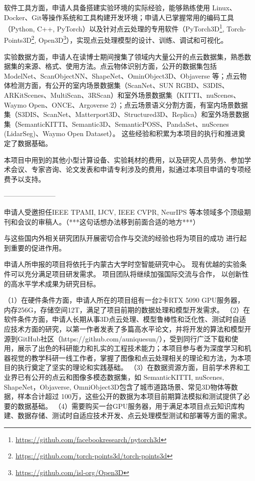 \documentclass[12pt]{article}
\begin{document}
软件工具方面，申请人具备搭建实验环境的实际经验，能够熟练使用 Linux、Docker、Git等操作系统和工具构建开发环境；申请人已掌握常用的编码工具（Python, C++, PyTorch）以及针对点云处理的专用软件（PyTorch3D\footnote{\url{https://github.com/facebookresearch/pytorch3d}}, Torch-Points3D\footnote{\url{https://github.com/torch-points3d/torch-points3d}}, Open3D\footnote{\url{https://github.com/isl-org/Open3D}}），实现点云处理模型的设计、训练、调试和可视化。

实验数据方面，申请人在读博士期间搜集了领域内大量公开的点云数据集，熟悉数据集的来源、格式、使用方法。点云物体识别方面，公开的数据集包括 ModelNet、ScanObjectNN、ShapeNet、OminObject3D、Objaverse 等；点云物体检测方面，有公开的室内场景数据集（ScanNet、SUN RGBD、S3DIS、ARKitScenes、MultiScan、3RScan）和室外场景数据集（KITTI、nuScenes、Waymo Open、ONCE、Argoverse 2）；点云场景语义分割方面，有室内场景数据集（S3DIS、ScanNet、Matterport3D、Structured3D、Replica）和室外场景数据集（SemanticKITTI、Semantic3D、SemanticPOSS、PandaSet、nuScenes (LidarSeg)、Waymo Open Dataset）。
这些经验和积累为本项目的执行和推进奠定了数据基础。

本项目中用到的其他小型计算设备、实验耗材的费用，以及研究人员劳务、参加学术会议、专家咨询、论文发表和申请专利涉及的费用，拟通过本项目申请的专项经费予以支持。

-----------------------

申请人受邀担任IEEE TPAMI, IJCV, IEEE CVPR, NeurIPS 等本领域多个顶级期刊和会议的审稿人。（***这句话想办法移到前面合适的地方***）

与这些国内外相关研究团队开展密切合作与交流的经验也将为项目的成功
进行起到重要的促进作用。

申请人所申报的项目将依托于内蒙古大学时空智能研究中心。
现有优越的实验条件可以充分满足项目研发需求。
项目团队将继续加强国际交流与合作，
以创新性的高水平学术成果为研究目标。

（1）在硬件条件方面，申请人所在的项目组有一台2卡RTX 5090 GPU服务器，内存256G，存储空间12T，满足了项目前期的数据处理和模型开发需求。
（2）在软件条件方面，申请人长期从事3D点云处理、模型鲁棒性和泛化性、测试时自适应技术方面的研究，以第一作者发表了多篇高水平论文，并将开发的算法和模型开源到GitHub社区（https://github.com/auniquesun/），受到同行广泛下载和使用，展示了出色的科研能力和扎实的工程技术能力；本项目参与者为深度学习和机器视觉的教学科研一线工作者，掌握了图像和点云处理相关的理论和方法，为本项目的执行奠定了坚实的理论和实践基础。
（3）在数据资源方面，目前学术界和工业界已有公开的点云和图像多模态数据集，如 SemanticKITTI, nuScenes, ShapeNet，Objaverse, OmniObject3D包含了城市道路场景、常见3D物体等数据，样本合计超过 100万，这些公开的数据为本项目前期算法模拟和测试提供了必要的数据基础。
（4）需要购买一台GPU服务器，用于满足本项目点云知识库构建、数据存储、测试时自适应技术开发、点云处理模型测试和部署等方面的需求。
\end{document}
